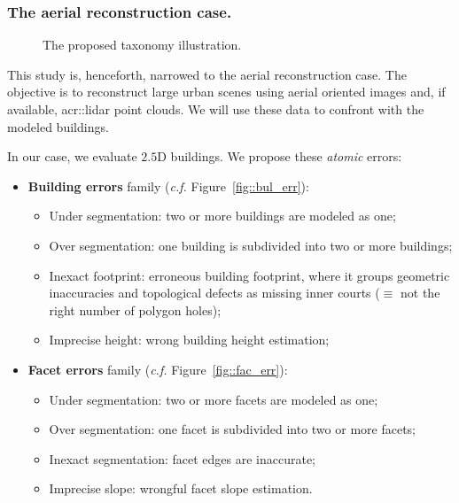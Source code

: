 \documentclass[runningheads]{llncs}
\begin{document}
\subsubsection{The aerial reconstruction case.}
  \begin{figure}
        \begin{center}
            
            \caption{\label{fig::taxonomy} The proposed taxonomy illustration. }
        \end{center}
    \end{figure}
This study is, henceforth, narrowed to the aerial reconstruction case. The objective is to reconstruct large urban scenes using aerial oriented images and, if available, \acrshort{acr::lidar} point clouds. We will use these data  to confront with the modeled buildings.

In our case, we evaluate $2.5$D buildings. We propose these \textit{atomic} errors:
	\begin{itemize}
		\item \textbf{Building errors} family (\textit{c.f.} Figure~\ref{fig::bul_err}):
        \begin{itemize}
        	\item Under segmentation: two or more buildings are modeled as one;
            \item Over segmentation: one building is subdivided into two or more buildings;
            \item Inexact footprint: erroneous building footprint, where it groups geometric inaccuracies and topological defects as missing inner courts ($\equiv$ not the right number of polygon holes);
            \item Imprecise height: wrong building height estimation;
        \end{itemize}
		\item \textbf{Facet errors} family (\textit{c.f.} Figure~\ref{fig::fac_err}):
        \begin{itemize}
        	\item Under segmentation: two or more facets are modeled as one;
            \item Over segmentation: one facet is subdivided into two or more facets;
            \item Inexact segmentation: facet edges are inaccurate;
            \item Imprecise slope: wrongful facet slope estimation.
        \end{itemize}
	\end{itemize}
\end{document}
